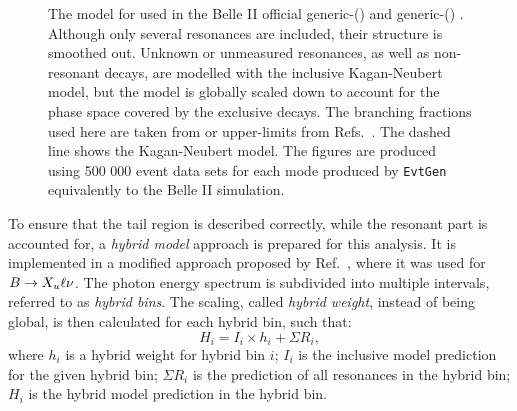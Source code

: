 \begin{figure}[htbp!]
    \centering
    \caption{\label{fig:generic_Xs_model} The model for \BtoXsgamma used in the Belle II official generic-\Bp () and generic-\Bz () \MC.
    Although only several resonances are included, their structure is smoothed out.
    Unknown or unmeasured resonances, as well as non-resonant decays, are modelled with the inclusive Kagan-Neubert model, but the model is globally scaled down to account for the phase space covered by the exclusive decays.
    The branching fractions used here are taken from  or upper-limits from Refs.~\cite{Workman:2022ynf,Amhis:2022mac}.
    The dashed line shows the Kagan-Neubert model.
    The figures are produced using 500 000 event data sets for each mode produced by \texttt{EvtGen} equivalently to the Belle II simulation.
    }    
\end{figure}

To ensure that the tail region is described correctly, while the resonant part is accounted for, a \textit{hybrid model} approach is prepared for this analysis.
It is implemented in a modified approach proposed by Ref.~\cite{Ramirez:1989yk}, where it was used for $B\rightarrow X_u\ell\nu$.
The \BtoXsgamma photon energy spectrum is subdivided into multiple intervals, referred to as \textit{hybrid bins}.
The scaling, called \textit{hybrid weight}, instead of being global, is then calculated for each hybrid bin, such that:
\begin{equation}\label{eq:hybrid_model_definition}
    H_i = I_i\times h_i + \Sigma R_i,
\end{equation}
where $h_i$ is a hybrid weight for hybrid bin $i$; 
$I_i$ is the inclusive model prediction for the given hybrid bin; 
$\Sigma R_i$ is the prediction of all resonances in the hybrid bin;
$H_i$ is the hybrid model prediction in the hybrid bin.

